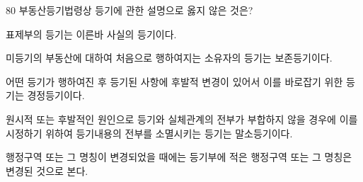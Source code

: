 \begin{question}{80}
부동산등기법령상 등기에 관한 설명으로 옳지 않은 것은?
\begin{choices}
  \item 표제부의 등기는 이른바 사실의 등기이다.
  \item 미등기의 부동산에 대하여 처음으로 행하여지는 소유자의 등기는 보존등기이다.
  \item 어떤 등기가 행하여진 후 등기된 사항에 후발적 변경이 있어서 이를 바로잡기 위한 등기는 경정등기이다.
  \item 원시적 또는 후발적인 원인으로 등기와 실체관계의 전부가 부합하지 않을 경우에 이를 시정하기 위하여 등기내용의 전부를 소멸시키는 등기는 말소등기이다.
  \item 행정구역 또는 그 명칭이 변경되었을 때에는 등기부에 적은 행정구역 또는 그 명칭은 변경된 것으로 본다.
\end{choices}
\end{question}

